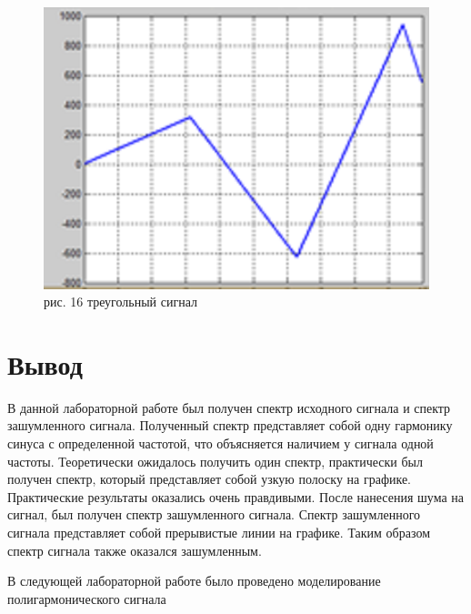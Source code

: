 \documentclass[10pt,a4paper]{report}
\begin{document}
\begin{figure}
\begin{center}
\includegraphics[angle=0, scale = 0.9]{16.png}\newline
рис. 16    треугольный сигнал\newline
\end{center}
\end{figure}
\chapter{Вывод}
В данной лабораторной работе был получен спектр исходного сигнала и спектр зашумленного сигнала. Полученный спектр представляет собой одну гармонику синуса с определенной частотой, что объясняется наличием у сигнала одной частоты. Теоретически ожидалось получить один спектр, практически был получен спектр, который представляет собой узкую полоску на графике. Практические результаты оказались очень правдивыми. После нанесения шума на сигнал, был получен спектр зашумленного сигнала. Спектр зашумленного сигнала представляет собой прерывистые линии на графике. Таким образом спектр сигнала также оказался зашумленным. \newline

В следующей лабораторной работе было проведено моделирование полигармонического сигнала
\end{document}
